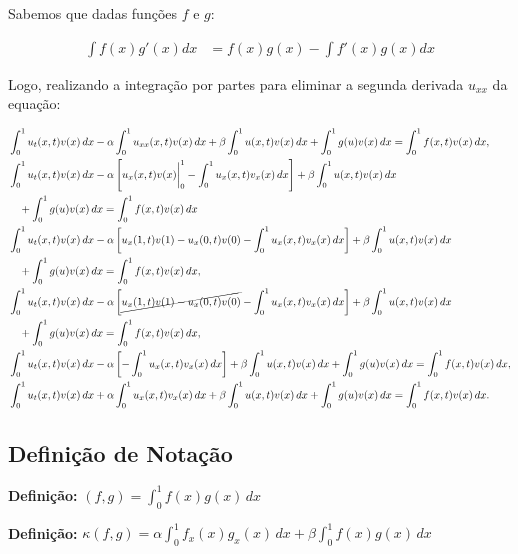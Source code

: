   Sabemos que dadas funções $f$ e $g$:

  \begin{align*}
    \int f(x)g'(x)dx &= f(x)g(x) - \int f'(x)g(x)dx
  \end{align*}

  Logo, realizando a integração por partes para eliminar a segunda derivada $u_{xx}$ da equação:

  \begin{align*}
    &\int_{0}^{1} u_t(x,t)v(x) \, dx  - \alpha \int_{0}^{1} u_{xx}(x,t)v(x) \, dx + \beta \int_{0}^{1} u(x,t)v(x) \, dx + \int_{0}^{1} g(u)v(x) \, dx  = \int_{0}^{1} f(x,t)v(x) \, dx, \\
    &\int_{0}^{1} u_t(x,t)v(x) \, dx  - \alpha \left[ u_x(x,t)v(x) \bigg|^{1}_{0}  - \int_{0}^{1} u_x(x,t)v_x(x) \, dx \right] + \beta \int_{0}^{1} u(x,t)v(x) \, dx \\
    &\quad + \int_{0}^{1} g(u)v(x) \, dx  = \int_{0}^{1} f(x,t)v(x) \, dx \\
    &\int_{0}^{1} u_t(x,t)v(x) \, dx  - \alpha \left[ u_x(1,t)v(1) - u_x(0,t)v(0)  - \int_{0}^{1} u_x(x,t)v_x(x) \, dx \right] + \beta \int_{0}^{1} u(x,t)v(x) \, dx \\
    &\quad + \int_{0}^{1} g(u)v(x) \, dx = \int_{0}^{1} f(x,t)v(x) \, dx, \\
    &\int_{0}^{1} u_t(x,t)v(x) \, dx - \alpha \left[ \cancel{u_x(1,t)v(1) - u_x(0,t)v(0)} - \int_{0}^{1} u_x(x,t)v_x(x) \, dx \right] + \beta \int_{0}^{1} u(x,t)v(x) \, dx \\
    &\quad + \int_{0}^{1} g(u)v(x) \, dx = \int_{0}^{1} f(x,t)v(x) \, dx, \\
    &\int_{0}^{1} u_t(x,t)v(x) \, dx - \alpha \left[ - \int_{0}^{1} u_x(x,t)v_x(x) \, dx \right] + \beta \int_{0}^{1} u(x,t)v(x) \, dx + \int_{0}^{1} g(u)v(x) \, dx = \int_{0}^{1} f(x,t)v(x) \, dx, \\
    &\int_{0}^{1} u_t(x,t)v(x) \, dx + \alpha \int_{0}^{1} u_x(x,t)v_x(x) \, dx + \beta \int_{0}^{1} u(x,t)v(x) \, dx + \int_{0}^{1} g(u)v(x) \, dx = \int_{0}^{1} f(x,t)v(x) \, dx.
  \end{align*}


\subsection*{Definição de Notação}

  \textbf{Definição:} $\displaystyle (f,g) = \int_{0}^{1} f(x)g(x) \, dx$

  \textbf{Definição:} $\displaystyle \kappa(f,g) = \alpha \int_{0}^{1} f_x(x)g_x(x) \, dx + \beta \int_{0}^{1} f(x)g(x) \, dx$

